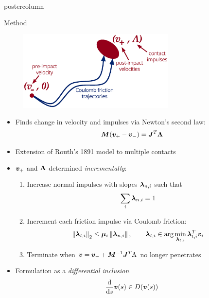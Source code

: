 \documentclass[final,hyperref={pdfpagelabels=false},5pt]{beamer}
\begin{document}
\begin{frame}
\begin{columns}
\begin{column}{.49\textwidth}
\begin{beamercolorbox}[center,wd=\textwidth]{postercolumn}
\begin{minipage}[T]{.95\textwidth}
{            \begin{block}{Method}
            	\begin{figure}
	              	\includegraphics[width=0.7\textwidth]{VelocityConnection}
	              \end{figure}
              \begin{itemize}
              \item Finds change in velocity and impulses via Newton's second law:
	                  $$\Mass (\Velocity_+ - \Velocity_-) = \J^T \Impulse$$
	              \item Extension of Routh's 1891 model to multiple contacts \cite{Routh91}
	              
	              \item $\bm{v}_+$ and $\Impulse$ determined \textit{incrementally}:
	              
	              \begin{enumerate}
	              	\item Increase normal impulses with slopes $\NormalForce[i]$ such that
	              		$$\sum_i \NormalForce[i] = 1$$
	              	\item Increment each friction impulse via Coulomb friction:
	             		$$\TwoNorm{\FrictionForce[i]} \leq \FrictionCoeff[i]\Norm{\NormalForce[i]},\qquad \FrictionForce[i] \in \arg \min_{\FrictionForce[i]} \FrictionForce[i]^T\Velocity_i$$
	              	\item Terminate when $\Velocity = \Velocity_- + \Mass^{-1}\J^T \Lambda$ no longer penetrates
	              \end{enumerate}
	              \item
	              Formulation as a \textit{differential inclusion}
	              $$\frac{\mathrm{d}}{\mathrm{d}s} \bm{v}(s) \in D(\bm{v}(s))$$
              \end{itemize}
            \end{block}
            \footnotesize{\color{pennbl}
				
				}
           \begin{columns}[c]
				\begin{column}{.25\textwidth}
				

\end{column}
\end{columns}}
\end{minipage}
\end{beamercolorbox}
\end{column}
\end{columns}
\end{frame}
\end{document}
